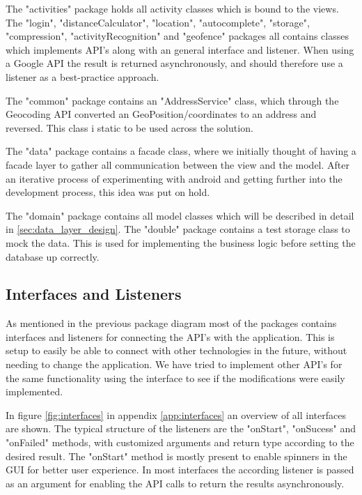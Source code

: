 The "activities" package holds all activity classes which is bound to the views. The "login", "distanceCalculator", "location", "autocomplete", "storage", "compression", "activityRecognition" and "geofence" packages all contains classes which implements API's along with an general interface and listener. When using a Google API the result is returned asynchronously, and should therefore use a listener as a best-practice approach.

The "common" package contains an "AddressService" class, which through the Geocoding API converted an GeoPosition/coordinates to an address and reversed. This class i static to be used across the solution.

The "data" package contains a facade class, where we initially thought of having a facade layer to gather all communication between the view and the model. After an iterative process of experimenting with android and getting further into the development process, this idea was put on hold.

The "domain" package contains all model classes which will be described in detail in \ref{sec:data_layer_design}.
The "double" package contains a test storage class to mock the data. This is used for implementing the business logic before setting the database up correctly.

\subsection{Interfaces and Listeners}
\label{sec:interfaces_and_listeners}

As mentioned in the previous package diagram most of the packages contains interfaces and listeners for connecting the API's with the application. This is setup to easily be able to connect with other technologies in the future, without needing to change the application. We have tried to implement other API's for the same functionality using the interface to see if the modifications were easily implemented.

In figure \ref{fig:interfaces} in appendix \ref{app:interfaces} an overview of all interfaces are shown. The typical structure of the listeners are the "onStart", "onSucess" and "onFailed" methods, with customized arguments and return type according to the desired result. The "onStart" method is mostly present to enable spinners in the GUI for better user experience.
In most interfaces the according listener is passed as an argument for enabling the API calls to return the results asynchronously.

